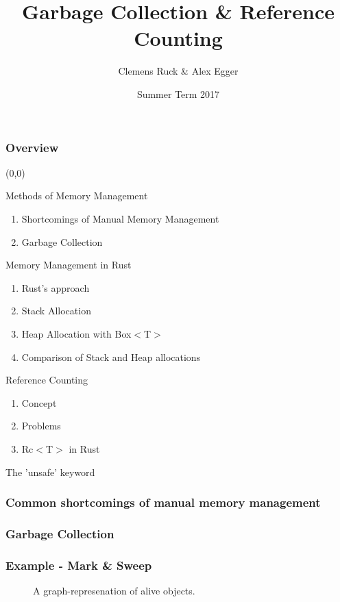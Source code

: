 \documentclass{beamer}
\title{Garbage Collection \& Reference Counting}
\author{Clemens Ruck \& Alex Egger}
\institute[TUM]{
\vspace{-19em}\tumheader\vspace{18em}}
\date{Summer Term 2017}
\begin{document}

\maketitle

    \begin{frame}
        \frametitle{Overview}
		\begin{textblock}{6}(0,0)
			\begin{alertblock}{Methods of Memory Management}
				\begin{enumerate}
					\item Shortcomings of Manual Memory Management
					\item Garbage Collection
				\end{enumerate}
			\end{alertblock}
			\begin{alertblock}{Memory Management in Rust}
				\begin{enumerate}
					\item Rust's approach
					\item Stack Allocation
					\item Heap Allocation with Box$<$T$>$
					\item Comparison of Stack and Heap allocations
				\end{enumerate}
			\end{alertblock}
			\begin{alertblock}{Reference Counting}
				\begin{enumerate}
					\item Concept
					\item Problems 
					\item Rc$<$T$>$ in Rust
				\end{enumerate}
			\end{alertblock}
			\begin{alertblock}{The 'unsafe' keyword}
			\end{alertblock}
		\end{textblock}
    \end{frame}
    \begin{frame}
        \frametitle{Common shortcomings of manual memory management}
    \end{frame}
    \begin{frame}		
		\frametitle{Garbage Collection}
    \end{frame}
	\begin{frame}
		\frametitle{Example - Mark \& Sweep}
		\begin{figure}
			\centering
			\def\svgwidth{230pt}
			
			\caption{A graph-represenation of alive objects.}
		\end{figure}
	\end{frame}
\end{document}

